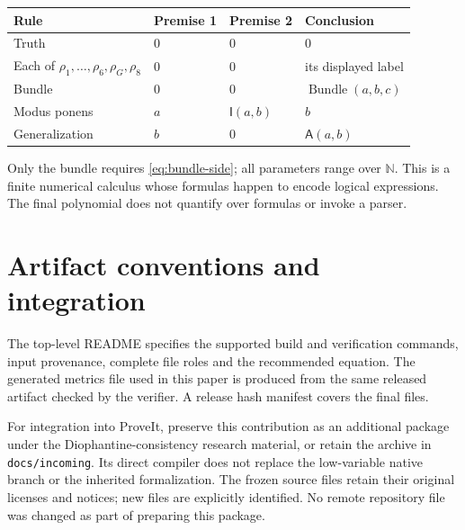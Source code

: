 \documentclass[11pt,a4paper]{article}
\theoremstyle{definition}\newtheorem{definition}[theorem]{Definition}
\theoremstyle{remark}\newtheorem{remark}[theorem]{Remark}
\newcommand{\N}{\mathbb N}\newcommand{\Z}{\mathbb Z}\newcommand{\Q}{\mathbb Q}
\newcommand{\Imp}{\mathsf I}\newcommand{\Rel}{\mathsf R}\newcommand{\All}{\mathsf A}
\numberwithin{equation}{section}
\begin{document}
\begin{longtable}{llll}
\toprule Rule & Premise 1 & Premise 2 & Conclusion\\\midrule\endhead
Truth &0&0&0\\
Each of \(\rho_1,\ldots,\rho_6,\rho_G,\rho_8\)&0&0&its displayed label\\
Bundle &0&0&\(\operatorname{Bundle}(a,b,c)\)\\
Modus ponens &\(a\)&\(\Imp(a,b)\)&\(b\)\\
Generalization &\(b\)&0&\(\All(a,b)\)\\\bottomrule
\end{longtable}
Only the bundle requires \eqref{eq:bundle-side}; all parameters range over
\(\N\). This is a finite numerical calculus whose formulas happen to
encode logical expressions. The final polynomial does not quantify over
formulas or invoke a parser.

\section{Artifact conventions and integration}

The top-level README specifies the supported build and verification
commands, input provenance, complete file roles and the recommended
equation. The generated metrics file used in this paper is produced from
the same released artifact checked by the verifier. A release hash
manifest covers the final files.

For integration into ProveIt, preserve this contribution as an additional
package under the Diophantine-consistency research material, or retain
the archive in \texttt{docs/incoming}. Its direct compiler does not
replace the low-variable native branch or the inherited formalization.
The frozen source files retain their original licenses and notices;
new files are explicitly identified. No remote repository file was
changed as part of preparing this package.
\end{document}
